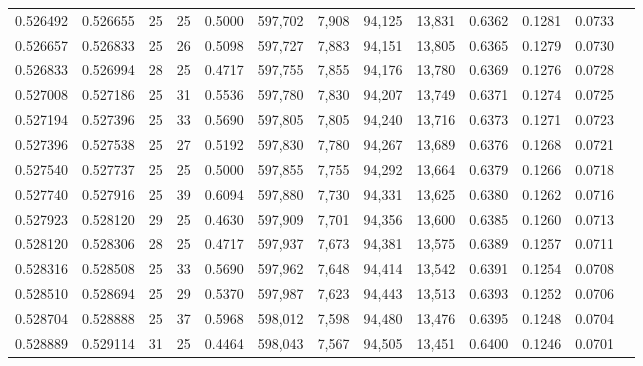 \begin{tabular}{rrrrrrrrrrrrr}
0.526492 & 0.526655 &    25 &  25 &                                     0.5000 & 597,702 &   7,908 &  94,125 &  13,831 & 0.6362 & 0.1281 & 0.0733 \\
0.526657 & 0.526833 &    25 &  26 &                                     0.5098 & 597,727 &   7,883 &  94,151 &  13,805 & 0.6365 & 0.1279 & 0.0730 \\
0.526833 & 0.526994 &    28 &  25 &                                     0.4717 & 597,755 &   7,855 &  94,176 &  13,780 & 0.6369 & 0.1276 & 0.0728 \\
0.527008 & 0.527186 &    25 &  31 &                                     0.5536 & 597,780 &   7,830 &  94,207 &  13,749 & 0.6371 & 0.1274 & 0.0725 \\
0.527194 & 0.527396 &    25 &  33 &                                     0.5690 & 597,805 &   7,805 &  94,240 &  13,716 & 0.6373 & 0.1271 & 0.0723 \\
0.527396 & 0.527538 &    25 &  27 &                                     0.5192 & 597,830 &   7,780 &  94,267 &  13,689 & 0.6376 & 0.1268 & 0.0721 \\
0.527540 & 0.527737 &    25 &  25 &                                     0.5000 & 597,855 &   7,755 &  94,292 &  13,664 & 0.6379 & 0.1266 & 0.0718 \\
0.527740 & 0.527916 &    25 &  39 &                                     0.6094 & 597,880 &   7,730 &  94,331 &  13,625 & 0.6380 & 0.1262 & 0.0716 \\
0.527923 & 0.528120 &    29 &  25 &                                     0.4630 & 597,909 &   7,701 &  94,356 &  13,600 & 0.6385 & 0.1260 & 0.0713 \\
0.528120 & 0.528306 &    28 &  25 &                                     0.4717 & 597,937 &   7,673 &  94,381 &  13,575 & 0.6389 & 0.1257 & 0.0711 \\
0.528316 & 0.528508 &    25 &  33 &                                     0.5690 & 597,962 &   7,648 &  94,414 &  13,542 & 0.6391 & 0.1254 & 0.0708 \\
0.528510 & 0.528694 &    25 &  29 &                                     0.5370 & 597,987 &   7,623 &  94,443 &  13,513 & 0.6393 & 0.1252 & 0.0706 \\
0.528704 & 0.528888 &    25 &  37 &                                     0.5968 & 598,012 &   7,598 &  94,480 &  13,476 & 0.6395 & 0.1248 & 0.0704 \\
0.528889 & 0.529114 &    31 &  25 &                                     0.4464 & 598,043 &   7,567 &  94,505 &  13,451 & 0.6400 & 0.1246 & 0.0701 \\

\end{tabular}
